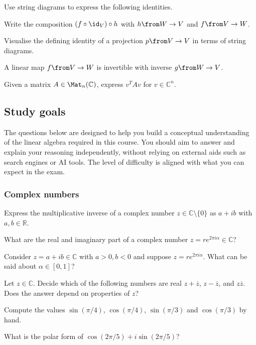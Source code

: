 \documentclass[a4paper,oneside, 12pt]{amsart}
\begin{document}
\begin{exercise}
  Use string diagrams to express the following identities.
  \begin{thmlist}
    \item Write the composition \((f\circ \id_{V})\circ h\) with \(h \from W \to V\) and \(f \from V\to W\).
    \item Visualise the defining identity of a projection \(p \from V \to V\) in terms of string diagrams.
    \item A linear map \(f \from V \to W\) is invertible with inverse \(g \from W \to V\).
    \item Given a matrix \(A\in \Mat_{n}( \mathbb{C})\), express \(v^{T}Av\) for \(v\in \mathbb{C}^{n}\).
  \end{thmlist}
\end{exercise}

\cleardoublepage
\subsection{Study goals}\label{sec:lin-alg-study-goals}
The questions below are designed to help you build a conceptual understanding of the linear algebra required in this course.
You should aim to answer and explain your reasoning independently, without relying on external aids such as search engines or AI tools.
The level of difficulty is aligned with what you can expect in the exam.

\subsubsection*{Complex numbers}
\begin{thmlist}
  \item Express the multiplicative inverse of a complex number \(z \in \mathbb{C}\setminus\{0\}\) as  \(a + ib\) with \(a, b \in \mathbb{R}\).
  \item What are the real and imaginary part of a complex number \(z = re^{2\pi i \alpha} \in \mathbb{C}\)?
  \item Consider \(z=a+ib \in \mathbb{C}\) with \(a>0, b<0\) and suppose \(z = re^{2\pi i \alpha}\).
  What can be said about \(\alpha \in [0,1]\)?
  \item Let \(z\in \mathbb{C} \).
  Decide which of the following numbers are real \(z + \overline{z}\), \(z - \overline{z}\), and \(z\overline{z}\).
  Does the answer depend on properties of \(z\)?
  \item Compute the values \(\sin(\pi/4)\), \(\cos(\pi/4)\), \(\sin(\pi/3)\) and \(\cos(\pi/3)\) by hand.
  \item What is the polar form of \(\cos(2\pi /5)+ i \sin(2\pi /5)\)?
\end{thmlist}
\end{document}
